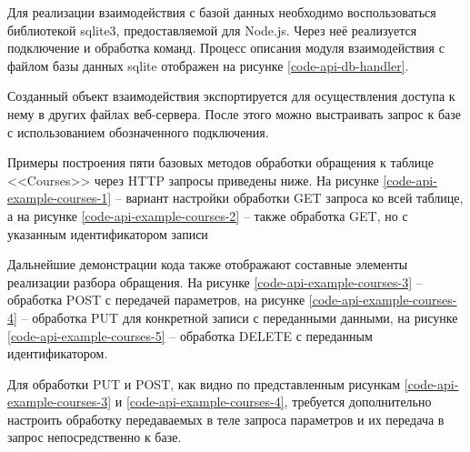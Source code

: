
Для реализации взаимодействия с базой данных необходимо воспользоваться библиотекой sqlite3, предоставляемой для Node.js.
Через неё реализуется подключение и обработка команд.
Процесс описания модуля взаимодействия с файлом базы данных sqlite отображен на рисунке \ref{code-api-db-handler}.


Созданный объект взаимодействия экспортируется для осуществления доступа к нему в других файлах веб-сервера.
После этого можно выстраивать запрос к базе с использованием обозначенного подключения.

Примеры построения пяти базовых методов обработки обращения к таблице <<Courses>> через HTTP запросы приведены ниже.
На рисунке \ref{code-api-example-courses-1} -- вариант настройки обработки GET запроса ко всей таблице, а на рисунке \ref{code-api-example-courses-2} -- также обработка GET, но с указанным идентификатором записи



Дальнейшие демонстрации кода также отображают составные элементы реализации разбора обращения.
На рисунке \ref{code-api-example-courses-3} -- обработка POST с передачей параметров, на рисунке \ref{code-api-example-courses-4} -- обработка PUT для конкретной записи с переданными данными,
на рисунке \ref{code-api-example-courses-5} -- обработка DELETE с переданным идентификатором.


Для обработки PUT и POST, как видно по представленным рисункам \ref{code-api-example-courses-3} и \ref{code-api-example-courses-4}, требуется дополнительно настроить обработку передаваемых в теле запроса параметров и их передача в запрос непосредственно к базе.


